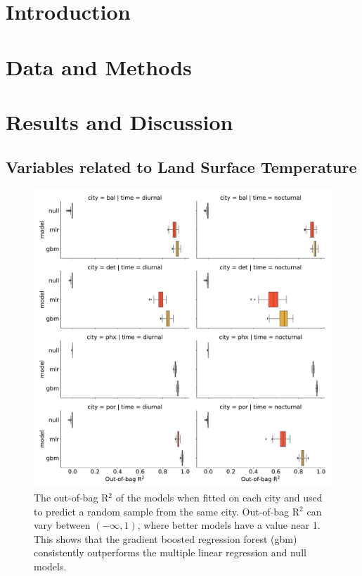 \documentclass[]{elsarticle}
\begin{document}
\linenumbers

\section{Introduction}


\section{Data and Methods}


\section{Results and Discussion}

\subsection{Variables related to Land Surface Temperature}


\begin{figure}[h]
\begin{center}
\includegraphics[width=\textwidth]{fig/report/holdout_results_r2.pdf}
\caption{The out-of-bag R$^2$ of the models when fitted on each city and used to predict a random sample from the same city. Out-of-bag R$^2$ can vary between $(-\infty, 1)$, where better models have a value near 1. This shows that the gradient boosted regression forest (gbm) consistently outperforms the multiple linear regression and null models.}
\label{fig:cityholdout_errors}
\end{center}
\end{figure}
\end{document}
